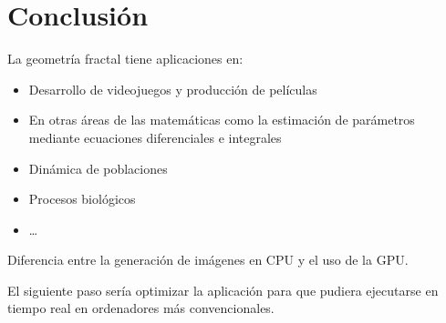 \section{Conclusión}

\begin{frame}{\insertsectionhead}

{\large 

La geometría fractal tiene aplicaciones en:
\begin{itemize}
    \item Desarrollo de videojuegos y producción de películas
    \item En otras áreas de las matemáticas como la estimación de parámetros mediante ecuaciones diferenciales e integrales
    \item Dinámica de poblaciones
    \item Procesos biológicos
    \item \dots
\end{itemize}
\vspace{\fill}

Diferencia entre la generación de imágenes en CPU y el uso de la GPU.

\vspace{\fill}
El siguiente paso sería optimizar la aplicación para que pudiera ejecutarse en tiempo real en ordenadores más convencionales.

}  
\end{frame}

